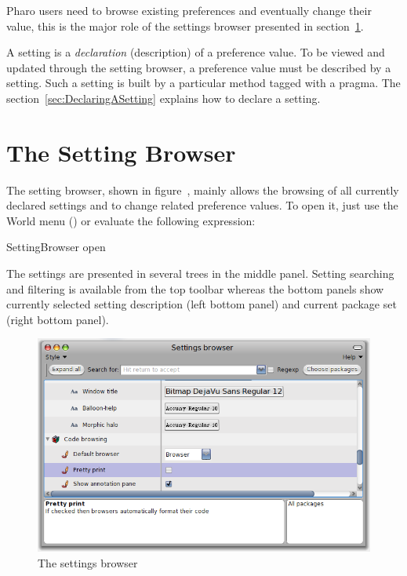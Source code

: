 \documentclass[a4paper,10pt,twoside]{book}
\begin{document}
Pharo users need to browse existing preferences and eventually change their value, this is the major role of the settings browser presented in section~\ref{sec:TheSettingsBrowser}.

A setting is a \emph{declaration} (description) of a preference value. To be viewed and updated through the setting browser, a preference value must be described by a setting. Such a setting is built by a particular method tagged with a pragma. The section~\ref{sec:DeclaringASetting} explains how to declare a setting.

\section{The Setting Browser}
\label{sec:TheSettingsBrowser}

The setting browser, shown in figure~, mainly allows the browsing of all currently declared settings and to change related preference values. To open it, just use the World menu () or evaluate the following expression:
\begin{code}{}
SettingBrowser open
\end{code}
The settings are presented in several trees in the middle panel. Setting searching and filtering is available from the top toolbar whereas the bottom panels show currently selected setting description (left bottom panel) and current package set (right bottom panel). 
\begin{figure}[tbh]
\begin{center}
\includegraphics[scale=0.3]{SettingBrowser}
\caption{The settings browser}
\end{center}
\end{figure}
\end{document}
